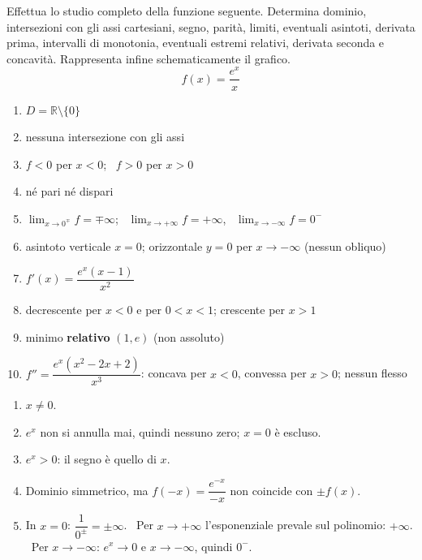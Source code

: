 \begin{question}[ID=2.4, subtitle={Studio completo di una funzione esponenziale fratta}, difficulty=difficile, tags={funzioni, studio di funzione, esponenziali}]
Effettua lo studio completo della funzione seguente. Determina dominio, intersezioni con gli assi cartesiani, segno, parità, limiti, eventuali asintoti, derivata prima, intervalli di monotonia, eventuali estremi relativi, derivata seconda e concavità. Rappresenta infine schematicamente il grafico.
\begin{equation*}
    f(x)=\dfrac{e^x}{x}
\end{equation*}
\begin{solution}
\begin{enumerate}
    \item $D=\mathbb{R}\setminus\{0\}$
    \item nessuna intersezione con gli assi
    \item $f<0$ per $x<0$; \ $f>0$ per $x>0$
    \item né pari né dispari
    \item $\lim_{x\to0^\mp}f=\mp\infty$; \ $\lim_{x\to+\infty}f=+\infty$, \ $\lim_{x\to-\infty}f=0^-$
    \item asintoto verticale $x=0$; orizzontale $y=0$ per $x\to-\infty$ (nessun obliquo)
    \item $f'(x)=\dfrac{e^x(x-1)}{x^2}$
    \item decrescente per $x<0$ e per $0<x<1$; crescente per $x>1$
    \item minimo \textbf{relativo} $(1,e)$ (non assoluto)
    \item $f''=\dfrac{e^x(x^2-2x+2)}{x^3}$: concava per $x<0$, convessa per $x>0$; nessun flesso
\end{enumerate}
\end{solution}
\begin{explanation}
\begin{enumerate}
    \item $x\neq0$.
    \item $e^x$ non si annulla mai, quindi nessuno zero; $x=0$ è escluso.
    \item $e^x>0$: il segno è quello di $x$.
    \item Dominio simmetrico, ma $f(-x)=\dfrac{e^{-x}}{-x}$ non coincide con $\pm f(x)$.
    \item In $x=0$: $\dfrac{1}{0^\pm}=\pm\infty$. \ Per $x\to+\infty$ l'esponenziale prevale sul polinomio: $+\infty$. \ Per $x\to-\infty$: $e^x\to0$ e $x\to-\infty$, quindi $0^-$.

\end{enumerate}
\end{explanation}
\end{question}
